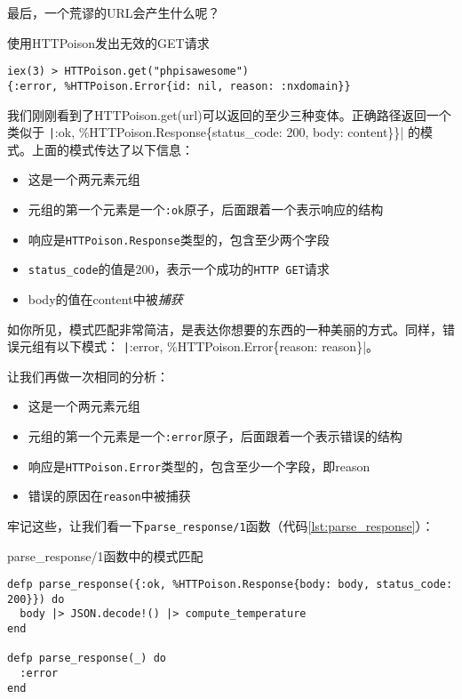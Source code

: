 最后，一个荒谬的URL会产生什么呢？

\begin{code}{使用HTTPoison发出无效的GET请求}
\begin{verbatim}
iex(3) > HTTPoison.get("phpisawesome")
{:error, %HTTPoison.Error{id: nil, reason: :nxdomain}}
\end{verbatim}
\label{lst:use_httpoison_get_invalid}
\end{code}

我们刚刚看到了HTTPoison.get(url)可以返回的至少三种变体。正确路径返回一个类似于
\texttt|{:ok, \%HTTPoison.Response\{status_code: 200, body: content\}\}}|
的模式。上面的模式传达了以下信息：

\begin{itemize}

\item  这是一个两元素元组
\item  元组的第一个元素是一个\texttt{:ok}原子，后面跟着一个表示响应的结构
\item  响应是\texttt{HTTPoison.Response}类型的，包含至少两个字段
\item  \texttt{status\_code}的值是200，表示一个成功的\texttt{HTTP  GET}请求
\item  body的值在content中被\emph{捕获}
\end{itemize}

如你所见，模式匹配非常简洁，是表达你想要的东西的一种美丽的方式。同样，错误元组有以下模式：
\texttt|{:error, \%HTTPoison.Error\{reason: reason\}}|。

让我们再做一次相同的分析：
\begin{itemize}

\item  这是一个两元素元组
\item  元组的第一个元素是一个\texttt{:error}原子，后面跟着一个表示错误的结构
\item  响应是\texttt{HTTPoison.Error}类型的，包含至少一个字段，即reason
\item  错误的原因在\texttt{reason}中被捕获
\end{itemize}

牢记这些，让我们看一下\texttt{parse\_response/1}函数（代码\ref{lst:parse_response}）：

\begin{code}{parse\_response/1函数中的模式匹配}
\begin{verbatim}
defp parse_response({:ok, %HTTPoison.Response{body: body, status_code: 200}}) do
  body |> JSON.decode!() |> compute_temperature
end

defp parse_response(_) do
  :error
end
\end{verbatim}
\label{lst:parse_response}
\end{code}

